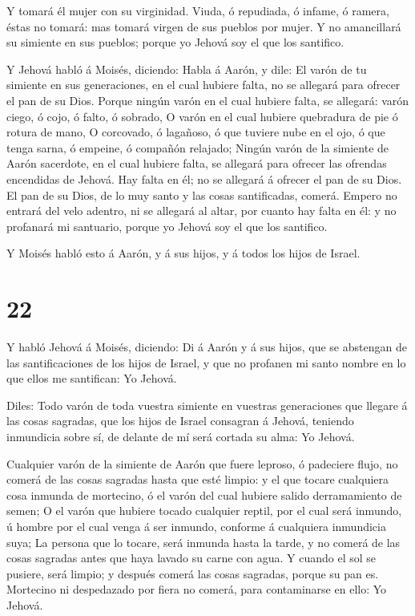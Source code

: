  Y tomará él mujer con su virginidad.  Viuda,
ó repudiada, ó infame, ó ramera, éstas no tomará: mas tomará virgen de
sus pueblos por mujer.  Y no amancillará su simiente en sus
pueblos; porque yo Jehová soy el que los santifico.

 Y Jehová habló á Moisés, diciendo:  Habla á
Aarón, y dile: El varón de tu simiente en sus generaciones, en el cual
hubiere falta, no se allegará para ofrecer el pan de su Dios.
 Porque ningún varón en el cual hubiere falta, se allegará:
varón ciego, ó cojo, ó falto, ó sobrado,  O varón en el
cual hubiere quebradura de pie ó rotura de mano,  O
corcovado, ó lagañoso, ó que tuviere nube en el ojo, ó que tenga sarna,
ó empeine, ó compañón relajado;  Ningún varón de la
simiente de Aarón sacerdote, en el cual hubiere falta, se allegará para
ofrecer las ofrendas encendidas de Jehová. Hay falta en él; no se
allegará á ofrecer el pan de su Dios.  El pan de su Dios,
de lo muy santo y las cosas santificadas, comerá.  Empero
no entrará del velo adentro, ni se allegará al altar, por cuanto hay
falta en él: y no profanará mi santuario, porque yo Jehová soy el que
los santifico.

 Y Moisés habló esto á Aarón, y á sus hijos, y á todos los
hijos de Israel.

\hypertarget{section-21}{%
\section{22}\label{section-21}}

 Y habló Jehová á Moisés, diciendo:  Di á Aarón
y á sus hijos, que se abstengan de las santificaciones de los hijos de
Israel, y que no profanen mi santo nombre en lo que ellos me santifican:
Yo Jehová.

 Diles: Todo varón de toda vuestra simiente en vuestras
generaciones que llegare á las cosas sagradas, que los hijos de Israel
consagran á Jehová, teniendo inmundicia sobre sí, de delante de mí será
cortada su alma: Yo Jehová.

 Cualquier varón de la simiente de Aarón que fuere leproso,
ó padeciere flujo, no comerá de las cosas sagradas hasta que esté
limpio: y el que tocare cualquiera cosa inmunda de mortecino, ó el varón
del cual hubiere salido derramamiento de semen;  O el varón
que hubiere tocado cualquier reptil, por el cual será inmundo, ú hombre
por el cual venga á ser inmundo, conforme á cualquiera inmundicia suya;
 La persona que lo tocare, será inmunda hasta la tarde, y no
comerá de las cosas sagradas antes que haya lavado su carne con agua.
 Y cuando el sol se pusiere, será limpio; y después comerá
las cosas sagradas, porque su pan es.  Mortecino ni
despedazado por fiera no comerá, para contaminarse en ello: Yo Jehová.

